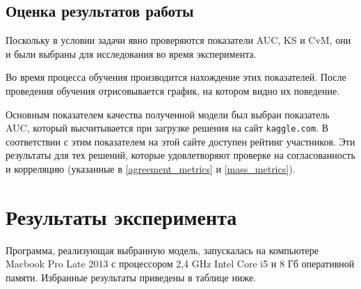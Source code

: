 \documentclass[14pt, a4paper]{extarticle}
\begin{document}
\subsection{Оценка результатов работы}

Поскольку в условии задачи явно проверяются показатели AUC, KS и CvM, они и были выбраны для исследования во время эксперимента.

Во время процесса обучения производится нахождение этих показателей. После проведения обучения отрисовывается график, на котором видно их поведение.

Основным показателем качества полученной модели был выбран показатель AUC, который высчитывается при загрузке решения на сайт \texttt{kaggle.com}. В соответствии с этим показателем на этой сайте доступен рейтинг участников. Эти результаты для тех решений, которые удовлетворяют проверке на согласованность и корреляцию (указанные в \ref{agreement_metrics} и \ref{mass_metrics}).


\newpage
\section{Результаты эксперимента}
\label{paragraph:results}

Программа, реализующая выбранную модель, запускалась на компьютере Macbook Pro Late 2013 с процессором 2,4 GHz Intel Core i5 и 8 Гб оперативной памяти. Избранные результаты приведены в таблице ниже.
\end{document}
